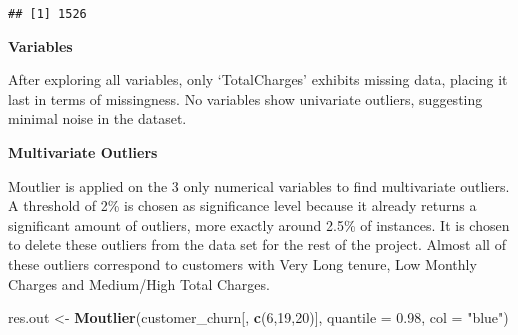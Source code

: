 \documentclass[
  a4paper]{article}
\newenvironment{Shaded}{\begin{snugshade}}{\end{snugshade}}
\newcommand{\AttributeTok}[1]{\textcolor[rgb]{0.13,0.29,0.53}{#1}}
\newcommand{\DecValTok}[1]{\textcolor[rgb]{0.00,0.00,0.81}{#1}}
\newcommand{\FloatTok}[1]{\textcolor[rgb]{0.00,0.00,0.81}{#1}}
\newcommand{\FunctionTok}[1]{\textcolor[rgb]{0.13,0.29,0.53}{\textbf{#1}}}
\newcommand{\NormalTok}[1]{#1}
\newcommand{\OtherTok}[1]{\textcolor[rgb]{0.56,0.35,0.01}{#1}}
\newcommand{\SpecialCharTok}[1]{\textcolor[rgb]{0.81,0.36,0.00}{\textbf{#1}}}
\newcommand{\StringTok}[1]{\textcolor[rgb]{0.31,0.60,0.02}{#1}}
\begin{document}
\begin{Shaded}
\end{Shaded}

\begin{verbatim}
## [1] 1526
\end{verbatim}

\textbf{Variables}

After exploring all variables, only `TotalCharges' exhibits missing
data, placing it last in terms of missingness. No variables show
univariate outliers, suggesting minimal noise in the dataset.

\textbf{Multivariate Outliers}

Moutlier is applied on the 3 only numerical variables to find
multivariate outliers. A threshold of 2\% is chosen as significance
level because it already returns a significant amount of outliers, more
exactly around 2.5\% of instances. It is chosen to delete these outliers
from the data set for the rest of the project. Almost all of these
outliers correspond to customers with Very Long tenure, Low Monthly
Charges and Medium/High Total Charges.

\begin{Shaded}
\begin{Highlighting}[]
\NormalTok{res.out }\OtherTok{\textless{}{-}} \FunctionTok{Moutlier}\NormalTok{(customer\_churn[, }\FunctionTok{c}\NormalTok{(}\DecValTok{6}\NormalTok{,}\DecValTok{19}\NormalTok{,}\DecValTok{20}\NormalTok{)], }\AttributeTok{quantile =} \FloatTok{0.98}\NormalTok{, }\AttributeTok{col =} \StringTok{"blue"}\NormalTok{)}
\end{Highlighting}
\end{Shaded}
\end{document}
